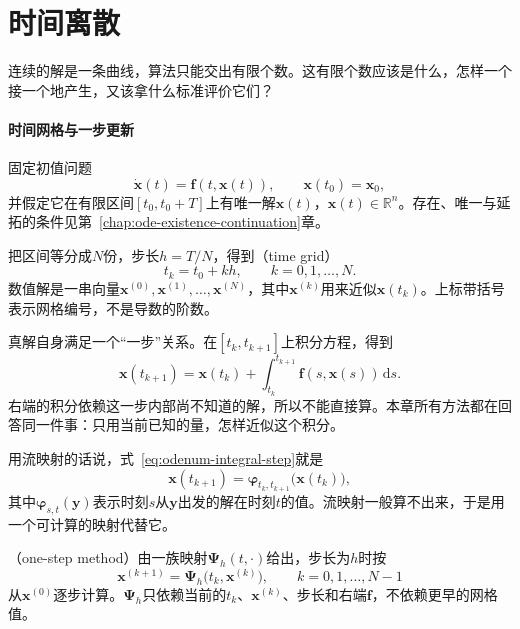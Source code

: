 \section{时间离散}
\label{sec:odenum-time-discretization}

连续的解是一条曲线，算法只能交出有限个数。这有限个数应该是什么，怎样一个接一个地产生，又该拿什么标准评价它们？

\paragraph{时间网格与一步更新}
固定初值问题
\begin{equation}
 \dot{\bm{x}}(t)=\bm{f}(t,\bm{x}(t)),\qquad \bm{x}(t_0)=\bm{x}_0,
 \label{eq:odenum-ivp}
\end{equation}
并假定它在有限区间$[t_0,t_0+T]$上有唯一解$\bm{x}(t)$，$\bm{x}(t)\in\mathbb{R}^{n}$。存在、唯一与延拓的条件见第~\ref{chap:ode-existence-continuation}章。

把区间等分成$N$份，步长$h=T/N$，得到（time grid）
\begin{equation}
 t_k=t_0+kh,\qquad k=0,1,\ldots,N.
 \label{eq:odenum-grid}
\end{equation}
数值解是一串向量$\bm{x}^{(0)},\bm{x}^{(1)},\ldots,\bm{x}^{(N)}$，其中$\bm{x}^{(k)}$用来近似$\bm{x}(t_k)$。上标带括号表示网格编号，不是导数的阶数。

真解自身满足一个“一步”关系。在$[t_k,t_{k+1}]$上积分方程，得到
\begin{equation}
 \bm{x}(t_{k+1})=\bm{x}(t_k)+\int_{t_k}^{t_{k+1}}\bm{f}(s,\bm{x}(s))\,\mathrm{d}s.
 \label{eq:odenum-integral-step}
\end{equation}
右端的积分依赖这一步内部尚不知道的解，所以不能直接算。本章所有方法都在回答同一件事：只用当前已知的量，怎样近似这个积分。

用流映射的话说，式~\eqref{eq:odenum-integral-step}就是
\[
 \bm{x}(t_{k+1})=\bm{\varphi}_{t_k,t_{k+1}}\bigl(\bm{x}(t_k)\bigr),
\]
其中$\bm{\varphi}_{s,t}(\bm{y})$表示时刻$s$从$\bm{y}$出发的解在时刻$t$的值。流映射一般算不出来，于是用一个可计算的映射代替它。

\begin{definition}[一步方法]
 \label{def:odenum-one-step}
 （one-step method）由一族映射$\bm{\Psi}_h(t,\cdot)$给出，步长为$h$时按
 \begin{equation}
  \bm{x}^{(k+1)}=\bm{\Psi}_h\bigl(t_k,\bm{x}^{(k)}\bigr),\qquad k=0,1,\ldots,N-1
  \label{eq:odenum-one-step}
 \end{equation}
 从$\bm{x}^{(0)}$逐步计算。$\bm{\Psi}_h$只依赖当前的$t_k$、$\bm{x}^{(k)}$、步长和右端$\bm{f}$，不依赖更早的网格值。
\end{definition}

